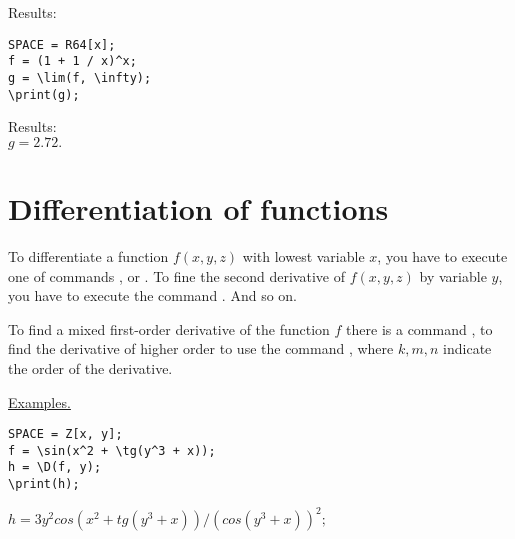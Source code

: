 Results:\\

\begin{verbatim}
SPACE = R64[x];
f = (1 + 1 / x)^x;
g = \lim(f, \infty);
\print(g);
\end{verbatim}
\vspace*{-3mm}

Results:\\
{$g = 2. 72. $}

\section{Differentiation of functions}
To differentiate a function $f(x,y,z)$ with lowest variable $x$,
 you have to execute one of commands ,  or  .
To fine the second derivative of $f(x,y,z)$ by variable $y$, you have to execute the command . And so on.

To find a mixed first-order derivative of the function $ f $ there is a command ,
  to find the derivative of higher order to use the command ,
  where $ k, m, n $ indicate the order of the derivative.
\smallskip

\underline{Examples. }

\vspace*{-3mm}
\begin{verbatim}
SPACE = Z[x, y];
f = \sin(x^2 + \tg(y^3 + x));
h = \D(f, y);
\print(h);
\end{verbatim}
\vspace*{-3mm}

{$h = 3y^2 cos(x^2+tg(y^3+x))/(cos(y^3+x))^2;$}

